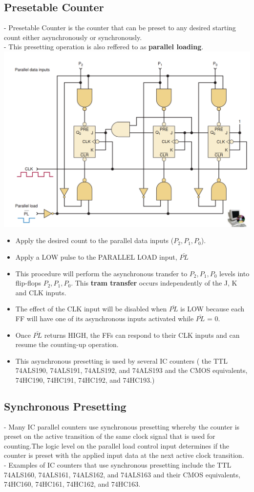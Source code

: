 \documentclass[12pt]{article}
\begin{document}
\subsection{Presetable Counter}
- Presetable Counter is the counter that can be preset to any desired starting count either asynchronously or synchronously. \\
- This presetting operation is also reffered to as \textbf{parallel loading}. \\
\includegraphics[scale = 0.6]{hinh50}
\bigbreak
\begin{itemize}
	\item Apply the desired count to the parallel data inputs ($P_{2}, P_{1}, P_{0}$).
	\item Apply a LOW pulse to the PARALLEL LOAD input, $\bar{PL}$
	\item This procedure will perform the asynchronous transfer to $P_{2}, P_{1}, P_{0}$ levels into flip-flops $P_{2}, P_{1}, P_{0}$. This \textbf{tram transfer} occurs independently of the J, K and CLK inputs.
	\item  The effect of the CLK input will be disabled when $\bar{PL}$ is LOW because each FF will have one of its asynchronous inputs activated while $\bar{PL}$ = 0.
	\item Once $\bar{PL}$ returns HIGH, the FFs can respond to their CLK inputs and can resume the counting-up operation.
	\item This asynchronous presetting is used by several IC counters ( the
TTL 74ALS190, 74ALS191, 74ALS192, and 74ALS193 and the CMOS equivalents, 74HC190, 74HC191, 74HC192, and 74HC193.)
\end{itemize}
\subsection{Synchronous Presetting}
- Many IC parallel counters use synchronous presetting whereby the counter is
preset on the active transition of the same clock signal that is used for counting.The logic level on the parallel load control input determines if the counter
is preset with the applied input data at the next active clock transition. \\
- Examples of IC counters that use synchronous presetting include the
TTL 74ALS160, 74ALS161, 74ALS162, and 74ALS163 and their CMOS equivalents, 74HC160, 74HC161, 74HC162, and 74HC163.\\
\end{document}
